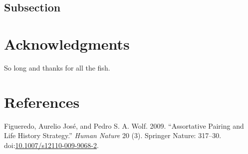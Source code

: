 \documentclass[fleqn,10pt,lineno]{wlpeerj} %
\theoremstyle{definition}
\theoremstyle{definition}
\theoremstyle{definition}
\theoremstyle{remark}
\begin{document}
\lipsum[14] 

\subsection*{Subsection}\label{subsection-3}

\lipsum[15-20] 

\section*{Acknowledgments}\label{acknowledgments}

So long and thanks for all the fish.

\section*{References}\label{references}

\hypertarget{refs}{}
\hypertarget{ref-Figueredo:2009dg}{}
Figueredo, Aurelio José, and Pedro S. A. Wolf. 2009. ``Assortative
Pairing and Life History Strategy.'' \emph{Human Nature} 20 (3).
Springer Nature: 317--30.
doi:\href{https://doi.org/10.1007/s12110-009-9068-2}{10.1007/s12110-009-9068-2}.
\end{document}
